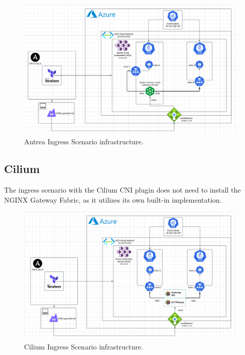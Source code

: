 \begin{figure}[tbh]
  \centering
  \includegraphics[width=1\columnwidth]{images/antrea_cloud_traffic_splitting.png}
  \caption{Antrea Ingress Scenario infrastructure.}
  \label{fig:antreaIngressScenarioArch}
\end{figure}

\subsection{Cilium}
\label{sec:ciliumIngressImpl}

The ingress scenario with the Cilium CNI plugin does not need to install the NGINX Gateway Fabric, as it utilizes its own built-in implementation.

\begin{figure}[H]
  \centering
  \includegraphics[width=1\columnwidth]{images/cilium_cloud_traffic_splitting.png}
  \caption{Cilium Ingress Scenario infrastructure.}
  \label{fig:ciliumIngressScenarioArch}
\end{figure}


